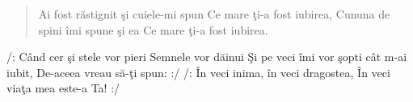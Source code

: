 
\begin{verse}
	Ai fost răstignit şi cuiele-mi spun
	Ce mare ţi-a fost iubirea,
	Cununa de spini îmi spune şi ea
	Ce mare ţi-a fost iubirea.
\end{verse}

\begin{chorus}
	/: Când cer şi stele vor pieri
	Semnele vor dăinui
	Şi pe veci îmi vor şopti cât m-ai iubit,
	De-aceea vreau să-ţi spun: :/
	/: În veci inima, în veci dragostea,
	În veci viaţa mea este-a Ta! :/
\end{chorus}

\endsong